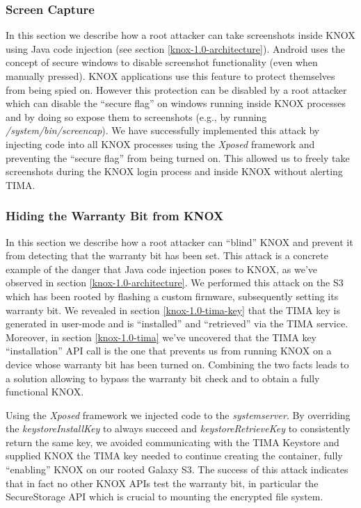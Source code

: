 \documentclass[11pt]{article}
\begin{document}
\subsubsection{Screen Capture} \label{knox-1.0-screen-capture}
In this section we describe how a root attacker can take screenshots inside KNOX using Java code injection (see section \ref{knox-1.0-architecture}).
Android uses the concept of secure windows to disable screenshot functionality (even when manually pressed).
KNOX applications use this feature to protect themselves from being spied on. However this protection can be disabled
by a root attacker which can disable the ``secure flag'' on windows running inside KNOX processes and by doing so expose
them to screenshots (e.g., by running \emph{/system/bin/screencap}). We have successfully implemented this attack by injecting code into all KNOX processes 
using the \emph{Xposed} framework and preventing the ``secure flag'' from being turned on. This allowed us to freely take screenshots during the 
KNOX login process and inside KNOX without alerting TIMA.

\subsubsection{Hiding the Warranty Bit from KNOX} \label{knox-1.0-hide-warranty-bit}
In this section we describe how a root attacker can ``blind'' KNOX and prevent it from detecting that the warranty bit has been set. 
This attack is a concrete example of the danger that Java code injection poses to KNOX, as we've observed in section \ref{knox-1.0-architecture}.
We performed this attack on the S3 which has been rooted by flashing a custom firmware, subsequently setting its warranty bit.
We revealed in section \ref{knox-1.0-tima-key} that the TIMA key is generated in user-mode and is ``installed'' and ``retrieved'' via the TIMA service.
Moreover, in section \ref{knox-1.0-tima} we've uncovered that the TIMA key ``installation'' API call is the one that prevents us from running KNOX
on a device whose warranty bit has been turned on. Combining the two facts leads to a solution allowing to bypass the warranty bit check
and to obtain a fully functional KNOX.

Using the \emph{Xposed} framework we injected code to the \emph{system\textunderscore server}. 
By overriding the \emph{keystoreInstallKey} to always succeed and \emph{keystoreRetrieveKey} to consistently return the same key, we avoided communicating
with the TIMA Keystore and supplied KNOX the TIMA key needed to continue creating the container, fully ``enabling'' KNOX on our rooted Galaxy S3.  
The success of this attack indicates that in fact no other KNOX APIs test the warranty bit, in particular the SecureStorage API which is crucial to 
mounting the encrypted file system.
\end{document}
